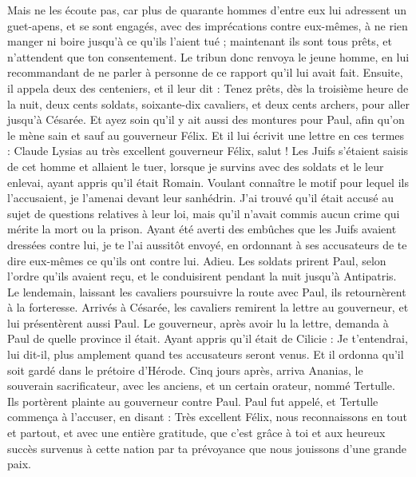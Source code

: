 \begin{multicols}{2}
Mais ne les écoute pas, car plus de quarante hommes d'entre eux lui adressent un guet-apens, et se sont engagés, avec des imprécations contre eux-mêmes, à ne rien manger ni boire jusqu'à ce qu'ils l'aient tué ; maintenant ils sont tous prêts, et n’attendent que ton consentement.
Le tribun donc renvoya le jeune homme, en lui recommandant de ne parler à personne de ce rapport qu’il lui avait fait.
Ensuite, il appela deux des centeniers, et il leur dit : Tenez prêts, dès la troisième heure de la nuit, deux cents soldats, soixante-dix cavaliers, et deux cents archers, pour aller jusqu’à Césarée.
Et ayez soin qu'il y ait aussi des montures pour Paul, afin qu’on le mène sain et sauf au gouverneur Félix.
Et il lui écrivit une lettre en ces termes :
Claude Lysias au très excellent gouverneur Félix, salut !
Les Juifs s’étaient saisis de cet homme et allaient le tuer, lorsque je survins avec des soldats et le leur enlevai, ayant appris qu’il était Romain.
Voulant connaître le motif pour lequel ils l'accusaient, je l’amenai devant leur sanhédrin.
J’ai trouvé qu’il était accusé au sujet de questions relatives à leur loi, mais qu’il n’avait commis aucun crime qui mérite la mort ou la prison.
Ayant été averti des embûches que les Juifs avaient dressées contre lui, je te l'ai aussitôt envoyé, en ordonnant à ses accusateurs de te dire eux-mêmes ce qu’ils ont contre lui. Adieu.
Les soldats prirent Paul, selon l’ordre qu’ils avaient reçu, et le conduisirent pendant la nuit jusqu’à Antipatris.
Le lendemain, laissant les cavaliers poursuivre la route avec Paul, ils retournèrent à la forteresse.
Arrivés à Césarée, les cavaliers remirent la lettre au gouverneur, et lui présentèrent aussi Paul.
Le gouverneur, après avoir lu la lettre, demanda à Paul de quelle province il était. Ayant appris qu'il était de Cilicie :
Je t'entendrai, lui dit-il, plus amplement quand tes accusateurs seront venus. Et il ordonna qu'il soit gardé dans le prétoire d'Hérode.
\VerseOne{}Cinq jours après, arriva Ananias, le souverain sacrificateur, avec les anciens, et un certain orateur, nommé Tertulle. Ils portèrent plainte au gouverneur contre Paul.
Paul fut appelé, et Tertulle commença à l'accuser, en disant :
Très excellent Félix, nous reconnaissons en tout et partout, et avec une entière gratitude, que c’est grâce à toi et aux heureux succès survenus à cette nation par ta prévoyance que nous jouissons d’une grande paix.

\end{multicols}
